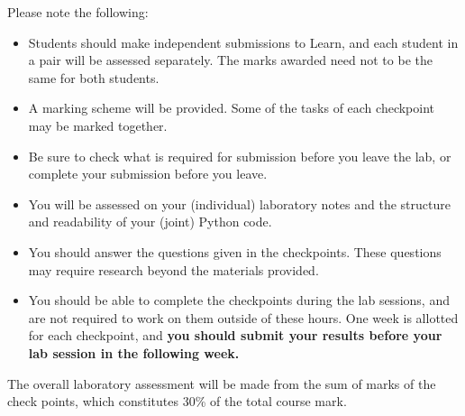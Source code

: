 Please note the following:
\begin{itemize}
\item Students should make independent submissions to Learn, and each student in a pair will be assessed separately. The marks awarded need not to be the same for both students.
\item A marking scheme will be provided. Some of the tasks of each checkpoint may be marked together.
\item Be sure to check what is required for submission before you leave the lab, or complete your submission before you leave.
\item You will be assessed on your (individual) laboratory notes and the structure and readability of your (joint) Python code.
\item You should answer the questions given in the checkpoints. These questions may require research beyond the materials provided.
\item You should be able to complete the checkpoints during the lab sessions, and are not required to work on them outside of these hours.
One week is allotted for each checkpoint, and {\bf you should submit your results before your lab session in the following week.}
\end{itemize}

The overall laboratory assessment will be made from the sum of marks of the check points, which constitutes 30\% of the total course mark.

